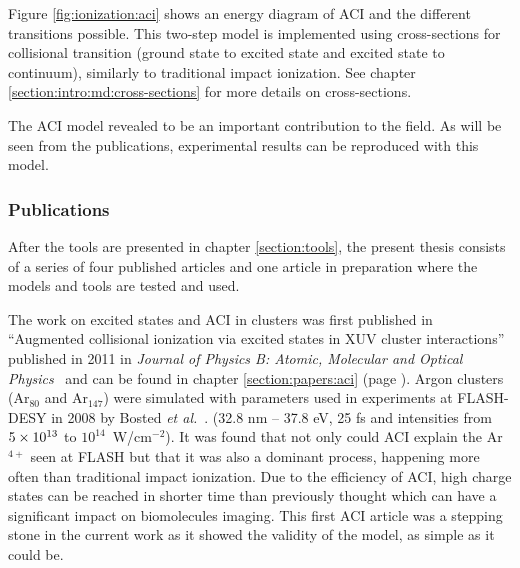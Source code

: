Figure \ref{fig:ionization:aci} shows an energy diagram of ACI and the
different transitions possible. This two-step model is implemented using
cross-sections for collisional transition (ground state to excited state and
excited state to continuum), similarly to traditional impact
ionization. See chapter \ref{section:intro:md:cross-sections} for more
details on cross-sections.

The ACI model revealed to be an important contribution to the field. As will be
seen from the publications, experimental results can be reproduced with this
model.



\subsubsection{Publications}

After the tools are presented in chapter \ref{section:tools}, the present thesis
consists of a series of four published articles and one article in preparation
where the models and tools are tested and used.



The work on excited states and ACI in clusters was first published in
``Augmented collisional ionization via excited states in XUV cluster
interactions'' published in 2011 in \textit{Journal of Physics B: Atomic,
Molecular and Optical Physics}~\cite{Ackad2011a} and can be found in chapter
\ref{section:papers:aci} (page \pageref{section:papers:aci}). Argon clusters
(Ar$_{80}$ and Ar$_{147}$) were simulated with parameters used in experiments
at FLASH-DESY in 2008 by Bosted \textit{et al.}~\cite{Bostedt2008}.
(32.8 nm -- 37.8 eV, 25 fs and intensities from $\ten{5}{13}$ to
$10^{14}$~W/cm$^{-2}$). It was found that not only could ACI explain the
Ar$^{4+}$ seen at FLASH but that it
was also a dominant process, happening more often than traditional impact ionization.
Due to the efficiency of ACI, high charge states can be reached in shorter time
than previously thought which can have a significant impact on biomolecules
imaging. This first ACI article was a stepping stone in the current work as it
showed the validity of the model, as simple as it could be.



